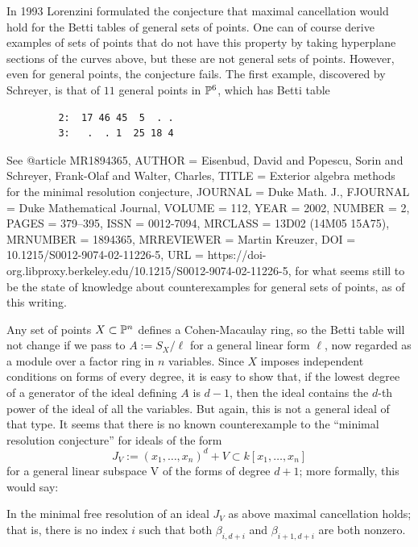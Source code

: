 In 1993 Lorenzini formulated the conjecture that maximal cancellation would hold for the
Betti tables of general sets of points.
One can of course derive examples of sets of points that do not have this property by taking hyperplane sections of the curves above, but these are not general sets of points. However, even for general points, the conjecture fails. The first example, discovered by
Schreyer, is that of $11$ general points in ${\mathbb P}^{6}$, which has Betti table
\begin{verbatim}
         2:  17 46 45  5  . .
         3:   .  . 1  25 18 4
\end{verbatim}
 See 
@article {MR1894365,
    AUTHOR = {Eisenbud, David and Popescu, Sorin and Schreyer, Frank-Olaf
              and Walter, Charles},
     TITLE = {Exterior algebra methods for the minimal resolution
              conjecture},
   JOURNAL = {Duke Math. J.},
  FJOURNAL = {Duke Mathematical Journal},
    VOLUME = {112},
      YEAR = {2002},
    NUMBER = {2},
     PAGES = {379--395},
      ISSN = {0012-7094},
   MRCLASS = {13D02 (14M05 15A75)},
  MRNUMBER = {1894365},
MRREVIEWER = {Martin Kreuzer},
       DOI = {10.1215/S0012-9074-02-11226-5},
       URL = {https://doi-org.libproxy.berkeley.edu/10.1215/S0012-9074-02-11226-5},
}
for what seems still to be the state of knowledge about counterexamples for general sets of points, as of this writing. 

Any set of points $X\subset {\mathbb P}^{n}$ defines a Cohen-Macaulay ring, so the Betti table will not change
if we pass to $A := S_{X}/\ell$ for a general linear form $\ell$, now regarded as a module over a factor ring in
$n$ variables. Since $X$ imposes independent conditions on forms of every degree, it is easy to show
that, if the lowest degree of a generator of the ideal defining $A$ is $d-1$, then the ideal contains the $d$-th power of the ideal of all the variables. But again, this is not a general ideal of that type. It seems that there is no known counterexample to the ``minimal resolution conjecture'' for ideals of the form
$$
J_{V}:= (x_{1},\dots,x_{n})^{d}+V \subset k[x_{1}, \dots, x_{n}]
$$
for a general linear subspace V of the forms of degree $d+1$; more formally, this would say:

\begin{conjecture}
 In the minimal free resolution of an ideal $J_{V}$ as above maximal cancellation holds; that is, there is no index $i$ such that both $\beta_{i,d+i}$ and $\beta_{i+1,d+i}$ are both nonzero.
\end{conjecture}

